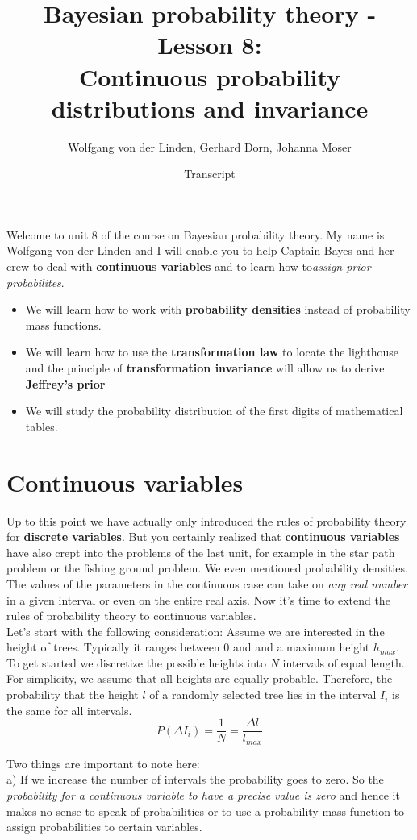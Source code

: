 \documentclass[12pt, a4paper]{scrartcl}
\title{Bayesian probability theory - Lesson 8:\\
Continuous probability distributions and invariance}
\author{Wolfgang von der Linden, Gerhard Dorn, Johanna Moser}
\date{Transcript}
\begin{document}
\setlength{\parindent}{0pt}
\maketitle
\onehalfspacing

Welcome to unit 8 of the course on Bayesian probability theory. My name
is Wolfgang von der Linden and I will enable you to help Captain Bayes and
her crew to deal with \textbf{continuous variables} and to learn how to\textit{assign prior probabilites}.
\begin{itemize}\item We will learn how to work with \textbf{probability densities} instead of probability mass functions.
\item We will learn how to use the \textbf{transformation law} to locate the lighthouse and the principle of \textbf{transformation invariance} will allow us to derive \textbf{Jeffrey’s prior}
\item We will study the probability distribution of the first digits of mathematical tables.
\end{itemize}


\section*{Continuous variables}
Up to this point we have actually only introduced the rules of probability
theory for \textbf{discrete variables}. But you certainly realized that \textbf{continuous
variables} have also crept into the problems of the last unit, for example in the star
path problem or the fishing ground problem. We even mentioned probability
densities. \\
The values of the parameters in the continuous case can take on
\textit{any real number} in a given interval or even on the entire real axis.
Now it’s time to extend the rules of probability theory to continuous variables.\\

Let’s start with the following consideration: Assume we are interested in the height of trees. Typically it ranges between 0 and and a maximum height $h_{max}$. To get started we discretize the possible heights into $N$ intervals of equal length. For simplicity, we assume that all heights are equally probable. Therefore,
the probability that the height $l$ of a randomly selected tree lies in
the interval $I_i$ is the same for all intervals.
\[P(\Delta I_i)=\frac 1N = \frac{\Delta l}{l_{max}}\]%

Two things are important to note here:\\
a) If we increase the number of intervals the probability goes to zero. So
the \textit{probability for a continuous variable to have a precise value is zero} and
hence it makes no sense to speak of probabilities or to use a probability mass
function to assign probabilities to certain variables.\\
\end{document}

